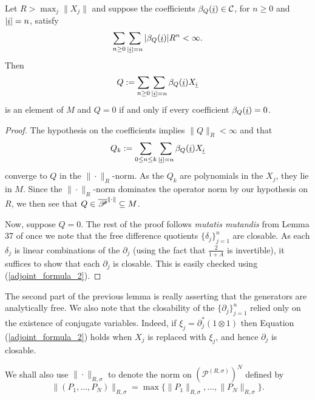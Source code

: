 \begin{lem}\label{analytically_free}
Let $R>\max_{j} \|X_j\|$ and suppose the coefficients $\beta_Q(\ul{i})\in \C$, for $n\geq 0$ and $|\ul{i}|=n$, satisfy
	\begin{align*}
		\sum_{n\geq 0} \sum_{|\ul{i}|=n} |\beta_Q(\ul{i})| R^n<\infty.
	\end{align*}
Then
	\begin{align*}
		Q:=\sum_{n\geq 0} \sum_{|\ul{i}|=n} \beta_Q(\ul{i}) X_{\ul{i}}
	\end{align*}
is an element of $M$ and $Q=0$ if and only if every coefficient $\beta_Q(\ul{i})=0$.
\end{lem}
\begin{proof}
The hypothesis on the coefficients implies $\|Q\|_R<\infty$ and that
	\begin{align*}
		Q_k:=\sum_{0\leq n \leq k} \sum_{|\ul{i}|=n} \beta_Q(\ul{i}) X_{\ul{i}}
	\end{align*}
converge to $Q$ in the $\|\cdot\|_R$-norm. As the $Q_k$ are polynomials in the $X_j$, they lie in $M$. Since the $\|\cdot\|_R$-norm dominates the operator norm by our hypothesis on $R$, we then see that $Q\in \overline{\P}^{\|\cdot\|}\subset M$.

Now, suppose $Q=0$. The rest of the proof follows \textit{mutatis mutandis} from Lemma 37 of \cite{Dab14} once we note that the free difference quotients $\{\delta_j\}_{j=1}^n$ are closable. As each $\delta_j$ is linear combinations of the $\partial_{j}$ (using the fact that $\frac{2}{1+A}$ is invertible), it suffices to show that each $\partial_{j}$ is closable. This is easily checked using (\ref{adjoint_formula_2}).
\end{proof}

\begin{rem}\label{conjugate_variables_suffice}
The second part of the previous lemma is really asserting that the generators are analytically free. We also note that the closability of the $\{\partial_j\}_{j=1}^n$ relied only on the existence of conjugate variables. Indeed, if $\xi_{j} = \partial_{j}^*(1\otimes 1)$ then Equation (\ref{adjoint_formula_2}) holds when $X_{j}$ is replaced with $\xi_{j}$, and hence $\partial_{j}$ is closable.
\end{rem}	

We shall also use $\|\cdot\|_{R,\sigma}$ to denote the norm on $\left(\mathscr{P}^{(R,\sigma)}\right)^N$ defined by
	\begin{equation*}
		\| (P_1,\ldots, P_N)\|_{R,\sigma}=\max\{\|P_1\|_{R,\sigma},\ldots, \|P_N\|_{R,\sigma}\}.
	\end{equation*}






